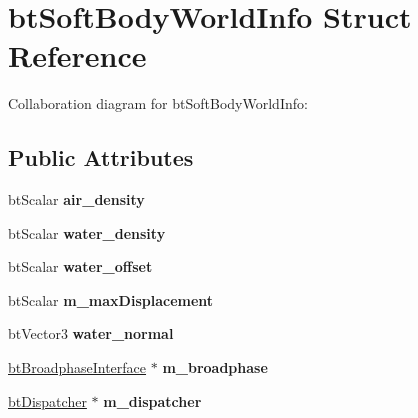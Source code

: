 \hypertarget{structbt_soft_body_world_info}{\section{bt\+Soft\+Body\+World\+Info Struct Reference}
\label{structbt_soft_body_world_info}
}


Collaboration diagram for bt\+Soft\+Body\+World\+Info\+:
\subsection*{Public Attributes}
\begin{DoxyCompactItemize}
\item 
\hypertarget{structbt_soft_body_world_info_a2a8dbb3c18aee460ad9651de8fd99954}{bt\+Scalar {\bfseries air\+\_\+density}}\label{structbt_soft_body_world_info_a2a8dbb3c18aee460ad9651de8fd99954}

\item 
\hypertarget{structbt_soft_body_world_info_a8a0447459bbe2965434cea84389940ef}{bt\+Scalar {\bfseries water\+\_\+density}}\label{structbt_soft_body_world_info_a8a0447459bbe2965434cea84389940ef}

\item 
\hypertarget{structbt_soft_body_world_info_ae790a85517d8d70e4f68b0f97e409370}{bt\+Scalar {\bfseries water\+\_\+offset}}\label{structbt_soft_body_world_info_ae790a85517d8d70e4f68b0f97e409370}

\item 
\hypertarget{structbt_soft_body_world_info_adf4545a58f7bc4075443d77e2ce82a44}{bt\+Scalar {\bfseries m\+\_\+max\+Displacement}}\label{structbt_soft_body_world_info_adf4545a58f7bc4075443d77e2ce82a44}

\item 
\hypertarget{structbt_soft_body_world_info_adc5ede5999551857f42510565b328317}{bt\+Vector3 {\bfseries water\+\_\+normal}}\label{structbt_soft_body_world_info_adc5ede5999551857f42510565b328317}

\item 
\hypertarget{structbt_soft_body_world_info_afd9ac8c00b3df5f3134ea448d237209e}{\hyperlink{classbt_broadphase_interface}{bt\+Broadphase\+Interface} $\ast$ {\bfseries m\+\_\+broadphase}}\label{structbt_soft_body_world_info_afd9ac8c00b3df5f3134ea448d237209e}

\item 
\hypertarget{structbt_soft_body_world_info_a4cdb28e69f0f3e14335d8519d7e4be49}{\hyperlink{classbt_dispatcher}{bt\+Dispatcher} $\ast$ {\bfseries m\+\_\+dispatcher}}\label{structbt_soft_body_world_info_a4cdb28e69f0f3e14335d8519d7e4be49}


\end{DoxyCompactItemize}
